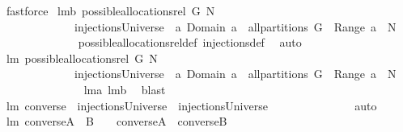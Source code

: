 \begin{isabellebody}
\ fastforce%
\endisatagproof
{\isafoldproof}%
%
\isadelimproof
\isanewline
%
\endisadelimproof
\isanewline
{}\isamarkupfalse%
\ lm{}{}b{\isacharcolon}\ {\isachardoublequoteopen}possible{\isacharunderscore}allocations{\isacharunderscore}rel\ G\ N\ {\isasymsupseteq}\ \isanewline
\ \ \ \ \ \ \ \ \ \ \ \ \ injectionsUniverse\ {\isasyminter}\ {\isacharbraceleft}a{\isachardot}\ Domain\ a\ {\isasymin}\ all{\isacharunderscore}partitions\ G\ {\isacharampersand}\ Range\ a\ {\isasymsubseteq}\ N{\isacharbraceright}{\isachardoublequoteclose}\isanewline
%
\isadelimproof
\ \ \ \ \ \ \ \ \ \ \ \ %
\endisadelimproof
%
\isatagproof
{}\isamarkupfalse%
\ possible{\isacharunderscore}allocations{\isacharunderscore}rel{\isacharunderscore}def\ injections{\isacharunderscore}def\ \isamarkupfalse%
\ auto%
\endisatagproof
{\isafoldproof}%
%
\isadelimproof
\isanewline
%
\endisadelimproof
\isanewline
\isanewline
{}\isamarkupfalse%
\ lm{}{}{\isacharcolon}\ {\isachardoublequoteopen}possible{\isacharunderscore}allocations{\isacharunderscore}rel\ G\ N\ \ \ {\isacharequal}\ \isanewline
\ \ \ \ \ \ \ \ \ \ \ \ \ injectionsUniverse\ {\isasyminter}\ {\isacharbraceleft}a{\isachardot}\ Domain\ a\ {\isasymin}\ all{\isacharunderscore}partitions\ G\ {\isacharampersand}\ Range\ a\ {\isasymsubseteq}\ N{\isacharbraceright}{\isachardoublequoteclose}\isanewline
%
\isadelimproof
\ \ \ \ \ \ \ \ \ \ \ \ \ %
\endisadelimproof
%
\isatagproof
{}\isamarkupfalse%
\ lm{}{}a\ lm{}{}b\ \isamarkupfalse%
\ blast%
\endisatagproof
{\isafoldproof}%
%
\isadelimproof
\isanewline
%
\endisadelimproof
\isanewline
\isanewline
{}\isamarkupfalse%
\ lm{}{}{\isacharcolon}\ {\isachardoublequoteopen}converse\ {\isacharbackquote}\ injectionsUniverse\ {\isacharequal}\ injectionsUniverse{\isachardoublequoteclose}\ \isanewline
%
\isadelimproof
\ \ \ \ \ \ \ \ \ \ \ \ %
\endisadelimproof
%
\isatagproof
{}\isamarkupfalse%
\ auto%
\endisatagproof
{\isafoldproof}%
%
\isadelimproof
\isanewline
%
\endisadelimproof
\isanewline
{}\isamarkupfalse%
\ lm{}{}{\isacharcolon}\ {\isachardoublequoteopen}converse{\isacharbackquote}{\isacharparenleft}A\ {\isasyminter}\ B{\isacharparenright}\ \ {\isacharequal}\ \ {\isacharparenleft}converse{\isacharbackquote}A{\isacharparenright}\ {\isasyminter}\ {\isacharparenleft}converse{\isacharbackquote}B{\isacharparenright}{\isachardoublequoteclose}\ \isanewline

\end{isabellebody}
